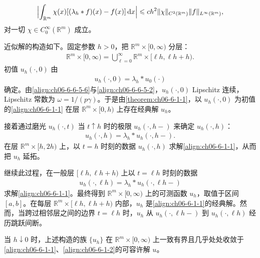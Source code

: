 \documentclass[../../main.tex]{subfiles}
\begin{document}
\begin{align}
\Bigl{|}\int_{\mathbb{R}^{m}}\chi(x)[(\lambda_{h}*f)(x)-f(x)]\,\mathrm{d}x\Bigr{|}\leqslant ch^{2}\|\chi\|_{C^{2}(\mathbb{R}^{m})}\|f\|_{L^{\infty}(\mathbb{R}^{m})},
\label{align:ch06-6-6-5-7}
\end{align}
对一切 $\chi\in C_{0}^{\infty}(\mathbb{R}^{m})$ 成立。

近似解的构造如下。固定参数 $h>0$，把 $\mathbb{R}^{m}\times[0,\infty)$ 分层：
\begin{align}
\mathbb{R}^{m}\times[0,\infty)=\bigcup_{\ell=0}^{\infty}\mathbb{R}^{m}\times[\ell h,\ell h+h).
\label{align:ch06-6-6-5-8}
\end{align}
初值 $u_{h}(\cdot,0)$ 由
\begin{align}
u_{h}(\cdot,0)=\lambda_{h}*u_{0}(\cdot)
\label{align:ch06-6-6-5-9}
\end{align}
确定。由\eqref{align:ch06-6-6-5-6}与\eqref{align:ch06-6-6-5-2}，$u_{h}(\cdot,0)$ Lipschitz 连续，Lipschitz 常数为 $\omega=1/(p\gamma)$。于是由\cref{theorem:ch06-6-1-1}，以 $u_{h}(\cdot,0)$ 为初值的\eqref{align:ch06-6-1-1} 在层 $\mathbb{R}^{m}\times[0,h)$ 上存在经典解 $u_{h}$。

接着通过磨光 $u_{h}(\cdot,t)$ 当 $t\uparrow h$ 时的极限 $u_{h}(\cdot,h-)$ 来确定 $u_{h}(\cdot,h)$：
\begin{align}
u_{h}(\cdot,h)=\lambda_{h}*u_{h}(\cdot,h-).
\label{align:ch06-6-6-5-10}
\end{align}
在层 $\mathbb{R}^{m}\times[h,2h)$ 上，以 $t=h$ 时刻的数据 $u_{h}(\cdot,h)$ 求解\eqref{align:ch06-6-1-1}，从而把 $u_{h}$ 延拓。

继续此过程，在一般层 $[\ell h,\ell h+h)$ 上以 $t=\ell h$ 时刻的数据
\begin{align}
u_{h}(\cdot,\ell h)=\lambda_{h}*u_{h}(\cdot,\ell h-)
\label{align:ch06-6-6-5-11}
\end{align}
求解\eqref{align:ch06-6-1-1}。最终得到 $\mathbb{R}^{m}\times[0,\infty)$ 上的可测函数 $u_{h}$，取值于区间 $[a,b]$。在每层 $\mathbb{R}^{m}\times[\ell h,\ell h+h)$ 内部，$u_{h}$ 是\eqref{align:ch06-6-1-1}的经典解。然而，当跨过相邻层之间的边界 $t=\ell h$ 时，$u_{h}$ 从 $u_{h}(\cdot,\ell h-)$ 到 $u_{h}(\cdot,\ell h)$ 经历跳跃间断。

\begin{theorem}\label{theorem:ch06-6-5-1}
当 $h\downarrow 0$ 时，上述构造的族 $\{u_{h}\}$ 在 $\mathbb{R}^{m}\times[0,\infty)$ 上一致有界且几乎处处收敛于\eqref{align:ch06-6-1-1}、\eqref{align:ch06-6-1-2}的可容许解 $u$。
\end{theorem}
\end{document}
